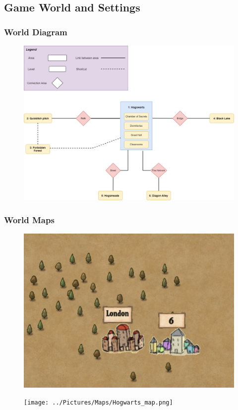 \subsection*{Game World and Settings}

\subsubsection*{World Diagram}
\begin{figure}[H]
\includegraphics[max width=\textwidth]{../Pictures/Maps/World_diagram.png}
\end{figure}

\subsubsection*{World Maps}
\begin{figure}[H]
\includegraphics[max width=\textwidth]{../Pictures/Maps/Diagon_Alley_map.png}
\end{figure}
\begin{figure}[H]
\texttt{[image: ../Pictures/Maps/Hogwarts\_map.png]}
\end{figure}

